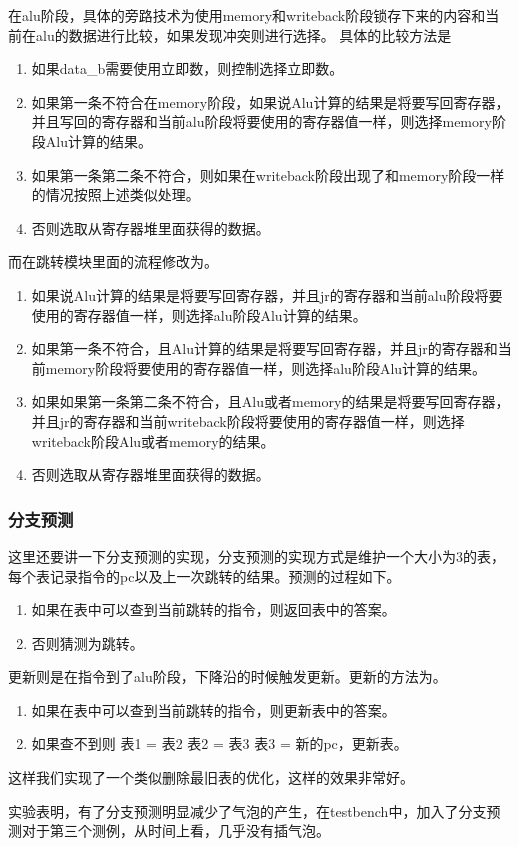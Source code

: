 在alu阶段，具体的旁路技术为使用memory和writeback阶段锁存下来的内容和当前在alu的数据进行比较，如果发现冲突则进行选择。
具体的比较方法是
\begin{enumerate}
        \item 如果data\_b需要使用立即数，则控制选择立即数。
        \item 如果第一条不符合在memory阶段，如果说Alu计算的结果是将要写回寄存器，并且写回的寄存器和当前alu阶段将要使用的寄存器值一样，则选择memory阶段Alu计算的结果。
        \item 如果第一条第二条不符合，则如果在writeback阶段出现了和memory阶段一样的情况按照上述类似处理。
        \item 否则选取从寄存器堆里面获得的数据。
\end{enumerate}
而在跳转模块里面的流程修改为。
\begin{enumerate}
        \item 如果说Alu计算的结果是将要写回寄存器，并且jr的寄存器和当前alu阶段将要使用的寄存器值一样，则选择alu阶段Alu计算的结果。
        \item 如果第一条不符合，且Alu计算的结果是将要写回寄存器，并且jr的寄存器和当前memory阶段将要使用的寄存器值一样，则选择alu阶段Alu计算的结果。
        \item 如果如果第一条第二条不符合，且Alu或者memory的结果是将要写回寄存器，并且jr的寄存器和当前writeback阶段将要使用的寄存器值一样，则选择writeback阶段Alu或者memory的结果。
        \item 否则选取从寄存器堆里面获得的数据。
\end{enumerate}

\subsubsection{分支预测}
这里还要讲一下分支预测的实现，分支预测的实现方式是维护一个大小为3的表，每个表记录指令的pc以及上一次跳转的结果。预测的过程如下。
\begin{enumerate}
        \item 如果在表中可以查到当前跳转的指令，则返回表中的答案。
        \item 否则猜测为跳转。
\end{enumerate}
更新则是在指令到了alu阶段，下降沿的时候触发更新。更新的方法为。
\begin{enumerate}
        \item 如果在表中可以查到当前跳转的指令，则更新表中的答案。
        \item 如果查不到则  表1  =  表2  表2  =  表3  表3  =  新的pc，更新表。
\end{enumerate}
这样我们实现了一个类似删除最旧表的优化，这样的效果非常好。

实验表明，有了分支预测明显减少了气泡的产生，在testbench中，加入了分支预测对于第三个测例，从时间上看，几乎没有插气泡。

